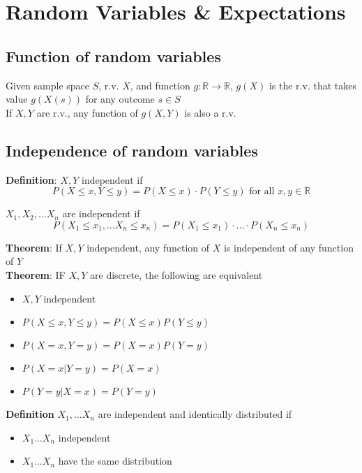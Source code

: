 \chapter{Random Variables \& Expectations}

\section{Function of random variables}

\begin{framed}
   Given sample space $S$, r.v. $X$, and function $g: \mathbb{R} \rightarrow \mathbb{R}$, $g(X)$ is the r.v. that takes value $g(X(s))$ for any outcome $s \in S$ \\

   If $X, Y$ are r.v., any function of $g(X, Y)$ is also a r.v.
\end{framed}

\section{Independence of random variables}

\begin{framed}
   \textbf{Definition}: $X, Y$ independent if
   \[
     P(X \leq x, Y \leq y) = P(X \leq x) \cdot P(Y \leq y) \text{ for all } x, y \in \mathbb{R}
   \] 

   $X_1, X_2, \hdots X_n$ are independent if
   \[
     P(X_1 \leq x_1, \hdots X_n \leq x_n) = P(X_1 \leq x_1) \cdot \hdots \cdot P(X_n \leq x_n)
   \] 

   \textbf{Theorem}: If $X, Y$ independent, any function of $X$ is independent of any function of $Y$ \\

   \textbf{Theorem}: IF $X, Y$ are discrete, the following are equivalent
   \begin{itemize}
      \item $X, Y$ independent 
      \item $P(X \leq x, Y \leq y) = P(X \leq x) P(Y \leq y)$
      \item $P(X = x, Y = y) = P(X = x) P(Y = y)$
      \item $P(X = x| Y = y) = P(X = x) $
      \item $P(Y = y| X = x) = P(Y = y) $
   \end{itemize}
\end{framed}

\begin{framed}
   \textbf{Definition} $X_1, \hdots X_n$ are independent and identically distributed if 
   \begin{itemize}
      \item $X_1 \hdots X_n$ independent
      \item $X_1 \hdots X_n$ have the same distribution
   \end{itemize}
\end{framed}


